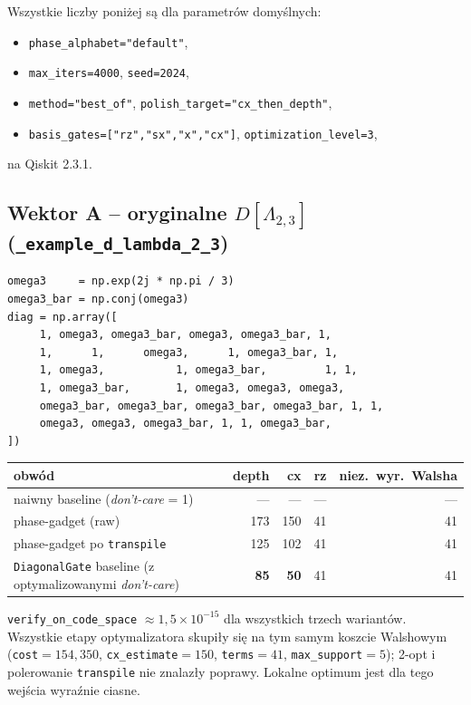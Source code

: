 \documentclass[11pt,a4paper]{article}
\newcommand{\1}{\mathbf{1}}
\newcommand{\code}[1]{\texttt{#1}}
\begin{document}
Wszystkie liczby poniżej są dla parametrów domyślnych:
\begin{itemize}[leftmargin=*]
  \item \code{phase\_alphabet="default"},
  \item \code{max\_iters=4000}, \code{seed=2024},
  \item \code{method="best\_of"}, \code{polish\_target="cx\_then\_depth"},
  \item \code{basis\_gates=["rz","sx","x","cx"]},
        \code{optimization\_level=3},
\end{itemize}
na Qiskit 2.3.1.

\subsection{Wektor A -- oryginalne $D[\Lambda_{2,3}]$
            (\texttt{\_example\_d\_lambda\_2\_3})}
\label{sec:vec-A}

\begin{lstlisting}
omega3     = np.exp(2j * np.pi / 3)
omega3_bar = np.conj(omega3)
diag = np.array([
     1, omega3, omega3_bar, omega3, omega3_bar, 1,
     1,      1,      omega3,      1, omega3_bar, 1,
     1, omega3,           1, omega3_bar,         1, 1,
     1, omega3_bar,       1, omega3, omega3, omega3,
     omega3_bar, omega3_bar, omega3_bar, omega3_bar, 1, 1,
     omega3, omega3, omega3_bar, 1, 1, omega3_bar,
])
\end{lstlisting}

\begin{center}
\begin{tabular}{l r r r r}
\toprule
\textbf{obwód} & \textbf{depth} & \textbf{cx} & \textbf{rz} &
\textbf{niez.\ wyr.\ Walsha}\\
\midrule
naiwny baseline (\emph{don't-care} = 1) & --- & --- & --- & ---\\
phase-gadget (raw)                       & 173 & 150 & 41 & 41\\
phase-gadget po \code{transpile}         & 125 & 102 & 41 & 41\\
\code{DiagonalGate} baseline
   (z optymalizowanymi \emph{don't-care}) & \textbf{85} & \textbf{50} & 41 & 41\\
\bottomrule
\end{tabular}
\end{center}

\noindent
\code{verify\_on\_code\_space} $\approx 1{,}5\times 10^{-15}$ dla
wszystkich trzech wariantów. Wszystkie etapy optymalizatora skupiły się
na tym samym koszcie Walshowym
(\code{cost}$=154{,}350$, \code{cx\_estimate}$=150$,
\code{terms}$=41$, \code{max\_support}$=5$); 2-opt i polerowanie
\code{transpile} nie znalazły poprawy. Lokalne optimum jest dla tego
wejścia wyraźnie ciasne.
\end{document}
